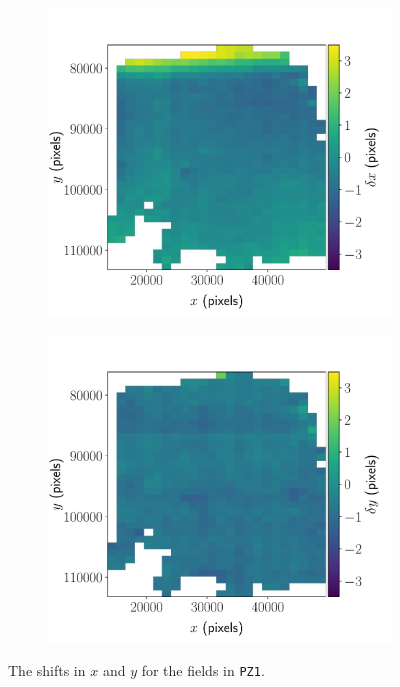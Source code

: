 \documentclass{article}
\begin{document}
\begin{figure}[ht]
	\centering
	\begin{subfigure}{0.49\linewidth}
		\includegraphics[width=\linewidth]{2D-shifts-JHUPolaris-x}
		\caption{}
		\label{fig:2Dpolarisx}
	\end{subfigure}
	\begin{subfigure}{0.49\linewidth}
		\includegraphics[width=\linewidth]{2D-shifts-JHUPolaris-y}
		\caption{}
		\label{fig:2Dpolarisy}
	\end{subfigure}
	\caption{The shifts in  $x$ and  $y$ for the fields in \texttt{PZ1}.}
	\label{fig:2Dpolaris}
\end{figure}
\end{document}
